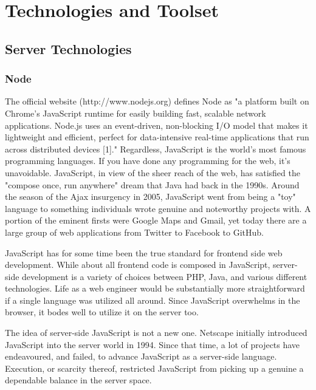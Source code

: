 \documentclass[../thesis.tex]{subfiles}
\begin{document}
\chapter{Technologies and Toolset}

\section{Server Technologies}
\subsection{Node}
The official website (http://www.nodejs.org) defines Node as "a platform built on Chrome's JavaScript runtime for easily building fast, scalable network applications. Node.js uses an event-driven, non-blocking I/O model that makes it lightweight and efficient, perfect for data-intensive real-time applications that run across distributed devices [1]."
\vspace{5mm}
Regardless, JavaScript is the world's most famous programming languages. If you have done any programming for the web, it's unavoidable. JavaScript, in view of the sheer reach of the web, has satisfied the "compose once, run anywhere" dream that Java had back in the 1990s.  
Around the season of the Ajax insurgency in 2005, JavaScript went from being a "toy" language to something individuals wrote genuine and noteworthy projects with. A portion of the eminent firsts were Google Maps and Gmail, yet today there are a large group of web applications from Twitter to Facebook to GitHub.
\vspace{5mm}

JavaScript has for some time been the true standard for frontend side web development. While about all frontend code is composed in JavaScript, server-side development is a variety of choices between PHP, Java, and various different technologies. Life as a web engineer would be substantially more straightforward if a single language was utilized all around. Since JavaScript overwhelms in the browser, it bodes well to utilize it on the server too. 
\vspace{5mm}

The idea of server-side JavaScript is not a new one. Netscape initially introduced JavaScript into the server world in 1994. Since that time, a lot of projects have endeavoured, and failed, to advance JavaScript as a server-side language. Execution, or scarcity thereof, restricted JavaScript from picking up a genuine a dependable balance in the server space. 
\vspace{5mm}
\end{document}
